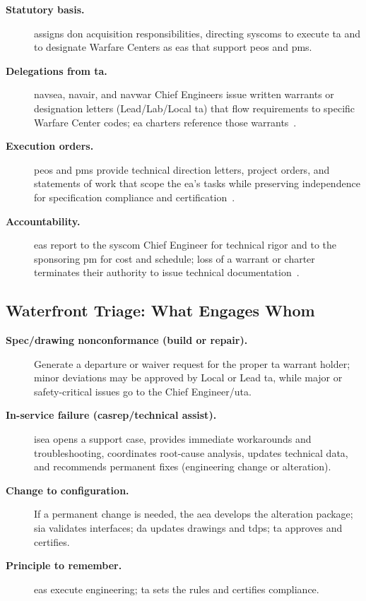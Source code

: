 \documentclass[../main.tex]{subfiles}
\begin{document}
\begin{description}
  \item[\textbf{Statutory basis.}] \autocite{SECNAV5400-15D} assigns \ac{don} acquisition responsibilities, directing \acp{syscom} to execute \ac{ta} and to designate Warfare Centers as \acp{ea} that support \acp{peo} and \acp{pm}.
  \item[\textbf{Delegations from \ac{ta}.}] \ac{navsea}, \ac{navair}, and \ac{navwar} Chief Engineers issue written warrants or designation letters (Lead/Lab/Local \ac{ta}) that flow requirements to specific Warfare Center codes; \ac{ea} charters reference those warrants~\autocite{edo-2-1-5-technical-authority-2025}.
  \item[\textbf{Execution orders.}] \acp{peo} and \acp{pm} provide technical direction letters, project orders, and statements of work that scope the \ac{ea}'s tasks while preserving independence for specification compliance and certification~\autocite{edo-2-1-4-warfare-centers-2024}.
  \item[\textbf{Accountability.}] \acp{ea} report to the \ac{syscom} Chief Engineer for technical rigor and to the sponsoring \ac{pm} for cost and schedule; loss of a warrant or charter terminates their authority to issue technical documentation~\autocite{edo-2-1-5-technical-authority-2025}.
\end{description}

\subsection{Waterfront Triage: What Engages Whom}
\begin{description}
  \item[\textbf{Spec/drawing nonconformance (build or repair).}] Generate a departure or waiver request for the proper \ac{ta} warrant holder; minor deviations may be approved by Local or Lead \ac{ta}, while major or safety-critical issues go to the Chief Engineer/\ac{uta}.
  \item[\textbf{In-service failure (\ac{casrep}/technical assist).}] \ac{isea} opens a support case, provides immediate workarounds and troubleshooting, coordinates root-cause analysis, updates technical data, and recommends permanent fixes (engineering change or alteration).
  \item[\textbf{Change to configuration.}] If a permanent change is needed, the \ac{aea} develops the alteration package; \ac{sia} validates interfaces; \ac{da} updates drawings and \acp{tdp}; \ac{ta} approves and certifies.
  \item[\textbf{Principle to remember.}] \acp{ea} execute engineering; \ac{ta} sets the rules and certifies compliance.
\end{description}
\end{document}
